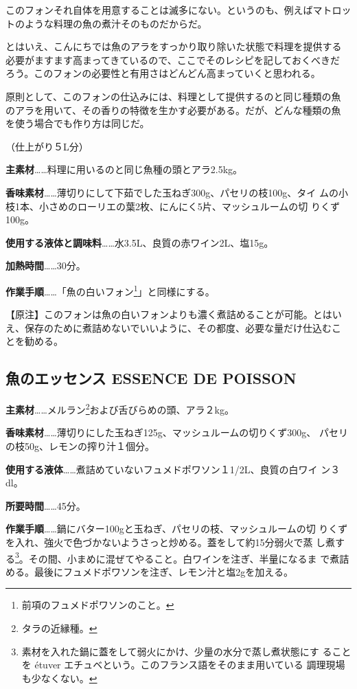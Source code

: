 \documentclass[twoside,12Q,b5paper]{escoffierltjsbook}
\begin{document}
このフォンそれ自体を用意することは滅多にない。というのも、例えばマトロッ
トのような料理の魚の煮汁そのものだからだ。

とはいえ、こんにちでは魚のアラをすっかり取り除いた状態で料理を提供する
必要がますます高まってきているので、ここでそのレシピを記しておくべきだ
ろう。このフォンの必要性と有用さはどんどん高まっていくと思われる。

原則として、このフォンの仕込みには、料理として提供するのと同じ種類の魚
のアラを用いて、その香りの特徴を生かす必要がある。だが、どんな種類の魚
を使う場合でも作り方は同じだ。

（仕上がり５L分）

\textbf{主素材}\ldots{}\ldots{}料理に用いるのと同じ魚種の頭とアラ2.5kg。

\textbf{香味素材}\ldots{}\ldots{}薄切りにして下茹でした玉ねぎ300g、パセリの枝100g、タイ
ムの小枝1本、小さめのローリエの葉2枚、にんにく5片、マッシュルームの切
りくず100g。

\textbf{使用する液体と調味料}\ldots{}\ldots{}水3.5L、良質の赤ワイン2L、塩15g。

\textbf{加熱時間}\ldots{}\ldots{}30分。

\textbf{作業手順}\ldots{}\ldots{}「魚の白いフォン\footnote{前項のフュメドポワソンのこと。}」と同様にする。

【原注】このフォンは魚の白いフォンよりも濃く煮詰めることが可能。とはい
え、保存のために煮詰めないでいいように、その都度、必要な量だけ仕込むこ
とを勧める。

\subsection*{魚のエッセンス ESSENCE DE
POISSON}\label{ux9b5aux306eux30a8ux30c3ux30bbux30f3ux30b9-essence-de-poisson}

\textbf{主素材}\ldots{}\ldots{}メルラン\footnote{タラの近縁種。}および舌びらめの頭、アラ２kg。

\textbf{香味素材}\ldots{}\ldots{}薄切りにした玉ねぎ125g、マッシュルームの切りくず300g、
パセリの枝50g、レモンの搾り汁１個分。

\textbf{使用する液体}\ldots{}\ldots{}煮詰めていないフュメドポワソン１1/2L、良質の白ワイ
ン３dl。

\textbf{所要時間}\ldots{}\ldots{}45分。

\textbf{作業手順}\ldots{}\ldots{}鍋にバター100gと玉ねぎ、パセリの枝、マッシュルームの切
りくずを入れ、強火で色づかないようさっと炒める。蓋をして約15分弱火で蒸
し煮する\footnote{素材を入れた鍋に蓋をして弱火にかけ、少量の水分で蒸し煮状態にす
  ることを étuver エチュベという。このフランス語をそのまま用いている
  調理現場も少なくない。}。その間、小まめに混ぜてやること。白ワインを注ぎ、半量になるま
で煮詰める。最後にフュメドポワソンを注ぎ、レモン汁と塩2gを加える。
\end{document}
